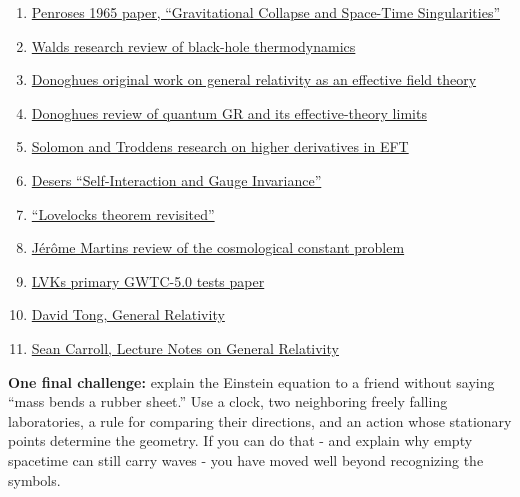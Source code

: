 \documentclass[
  11pt,
  letterpaper,
  oneside,
  openany]{scrbook}
\begin{document}
\begin{enumerate}
{  formulations}
\item
  \href{https://link.aps.org/doi/10.1103/PhysRevLett.14.57}{Penrose\textquotesingle s
  1965 paper, ``Gravitational Collapse and Space-Time Singularities''}
\item
  \href{https://arxiv.org/abs/gr-qc/9912119}{Wald\textquotesingle s
  research review of black-hole thermodynamics}
\item
  \href{https://arxiv.org/abs/gr-qc/9405057}{Donoghue\textquotesingle s
  original work on general relativity as an effective field theory}
\item
  \href{https://arxiv.org/abs/2211.09902}{Donoghue\textquotesingle s
  review of quantum GR and its effective-theory limits}
\item
  \href{https://arxiv.org/abs/1709.09695}{Solomon and
  Trodden\textquotesingle s research on higher derivatives in EFT}
\item
  \href{https://arxiv.org/abs/gr-qc/0411023}{Deser\textquotesingle s
  ``Self-Interaction and Gauge Invariance''}
\item
  \href{https://arxiv.org/html/1005.2386v4}{``Lovelock\textquotesingle s
  theorem revisited''}
\item
  \href{https://arxiv.org/abs/1205.3365}{Jérôme Martin\textquotesingle s
  review of the cosmological constant problem}
\item
  \href{https://arxiv.org/abs/2607.19293}{LVK\textquotesingle s primary
  GWTC-5.0 tests paper}
\item
  \href{https://davidtong.org/teaching/general-relativity/}{David Tong,
  General Relativity}
\item
  \href{https://preposterousuniverse.com/grnotes/}{Sean Carroll, Lecture
  Notes on General Relativity}
\end{enumerate}

\textbf{One final challenge:} explain the Einstein equation to a friend
without saying ``mass bends a rubber sheet.'' Use a clock, two
neighboring freely falling laboratories, a rule for comparing their
directions, and an action whose stationary points determine the
geometry. If you can do that - and explain why empty spacetime can still
carry waves - you have moved well beyond recognizing the symbols.

\backmatter
\end{document}
